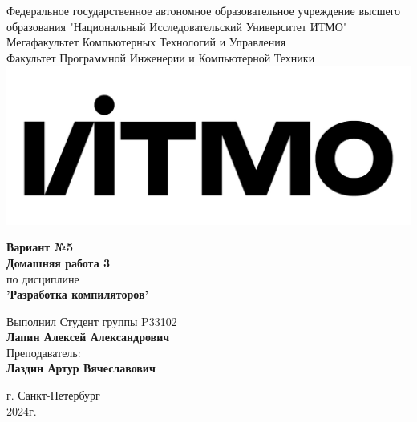 \documentclass[12pt,onecolumn]{article}
\begin{document}
\setcounter{tocdepth}{4}
\begin{center}
    Федеральное государственное автономное образовательное учреждение высшего образования "Национальный Исследовательский Университет ИТМО"\\
    Мегафакультет Компьютерных Технологий и Управления\\
    Факультет Программной Инженерии и Компьютерной Техники \\
    \includegraphics[scale=0.3]{image/itmo.jpg} %
\end{center}
\vspace{1cm}


\begin{center}
    \large \textbf{Вариант №5}\\
    \textbf{Домашняя работа 3}\\
    по дисциплине\\
    \textbf{'Разработка компиляторов'}
\end{center}

\vspace{2cm}

\begin{flushright}
    Выполнил Студент  группы P33102\\
    \textbf{Лапин Алексей Александрович}\\
    Преподаватель: \\
    \textbf{Лаздин Артур Вячеславович}\\
\end{flushright}

\vspace{9cm}
\begin{center}
    г. Санкт-Петербург\\
    2024г.
\end{center}
\pagestyle{empty}
\end{document}

